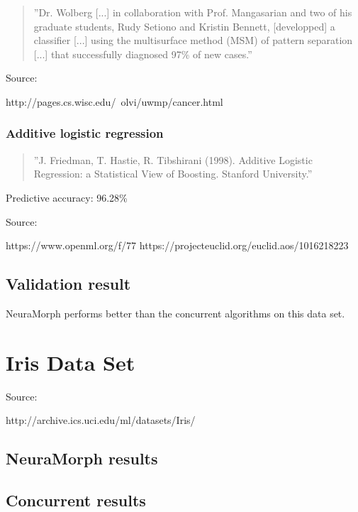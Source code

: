 \documentclass[8pt, a4paper]{article}
\begin{document}
\begin{quote}
''Dr. Wolberg [...] in collaboration with Prof. Mangasarian and two of his graduate students, Rudy Setiono and Kristin Bennett, [developped] a classifier [...] using the multisurface method (MSM) of pattern separation [...] that successfully diagnosed 97\% of new cases.''
\end{quote}

Source:

http://pages.cs.wisc.edu/~olvi/uwmp/cancer.html

\subsubsection{Additive logistic regression}

\begin{quote}
''J. Friedman, T. Hastie, R. Tibshirani (1998). Additive Logistic Regression: a Statistical View of Boosting. Stanford University.''
\end{quote}

Predictive accuracy: 96.28\%

Source:

https://www.openml.org/f/77
https://projecteuclid.org/euclid.aos/1016218223

\subsection{Validation result}

NeuraMorph performs better than the concurrent algorithms on this data set.



\newpage
\section{Iris Data Set}

Source: 

http://archive.ics.uci.edu/ml/datasets/Iris/

\subsection{NeuraMorph results}



\subsection{Concurrent results}
\end{document}

